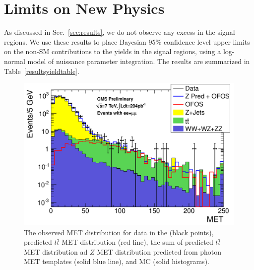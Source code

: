 \section{Limits on New Physics}
\label{sec:limit}

As discussed in Sec.~\ref{sec:results}, we do not observe any excess in the signal regions.
We use these results to place Bayesian 95\% confidence level upper limits~\cite{ref:cl95cms} on 
the non-SM contributions to the yields in the signal regions, using a log-normal model
of nuissance parameter integration. The results are summarized in Table~\ref{resultsyieldtable}.  

\begin{figure}[hbt]
\begin{center}
\includegraphics[width=0.78\linewidth]{plots/lep_metPredicted.pdf}
\caption{\label{fig:results}\protect 
  The observed MET distribution for data in the (black points),
  predicted $t\bar{t}$ MET distribution (red line), the sum of predicted %
  $t\bar{t}$ MET distribution ad
  $Z$  MET  distribution  predicted  from photon  MET  templates
  (solid blue line),  and MC (solid histograms). 
  }
\end{center}
\end{figure}

